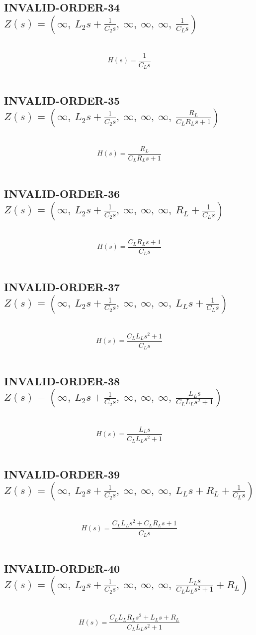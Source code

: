 \documentclass{article}
\begin{document}
\subsection{INVALID-ORDER-34 $Z(s) = \left( \infty, \  L_{2} s + \frac{1}{C_{2} s}, \  \infty, \  \infty, \  \infty, \  \frac{1}{C_{L} s}\right)$ } \ 
\textbf{\[H(s) = \frac{1}{C_{L} s}\] } \ 
\subsection{INVALID-ORDER-35 $Z(s) = \left( \infty, \  L_{2} s + \frac{1}{C_{2} s}, \  \infty, \  \infty, \  \infty, \  \frac{R_{L}}{C_{L} R_{L} s + 1}\right)$ } \ 
\textbf{\[H(s) = \frac{R_{L}}{C_{L} R_{L} s + 1}\] } \ 
\subsection{INVALID-ORDER-36 $Z(s) = \left( \infty, \  L_{2} s + \frac{1}{C_{2} s}, \  \infty, \  \infty, \  \infty, \  R_{L} + \frac{1}{C_{L} s}\right)$ } \ 
\textbf{\[H(s) = \frac{C_{L} R_{L} s + 1}{C_{L} s}\] } \ 
\subsection{INVALID-ORDER-37 $Z(s) = \left( \infty, \  L_{2} s + \frac{1}{C_{2} s}, \  \infty, \  \infty, \  \infty, \  L_{L} s + \frac{1}{C_{L} s}\right)$ } \ 
\textbf{\[H(s) = \frac{C_{L} L_{L} s^{2} + 1}{C_{L} s}\] } \ 
\subsection{INVALID-ORDER-38 $Z(s) = \left( \infty, \  L_{2} s + \frac{1}{C_{2} s}, \  \infty, \  \infty, \  \infty, \  \frac{L_{L} s}{C_{L} L_{L} s^{2} + 1}\right)$ } \ 
\textbf{\[H(s) = \frac{L_{L} s}{C_{L} L_{L} s^{2} + 1}\] } \ 
\subsection{INVALID-ORDER-39 $Z(s) = \left( \infty, \  L_{2} s + \frac{1}{C_{2} s}, \  \infty, \  \infty, \  \infty, \  L_{L} s + R_{L} + \frac{1}{C_{L} s}\right)$ } \ 
\textbf{\[H(s) = \frac{C_{L} L_{L} s^{2} + C_{L} R_{L} s + 1}{C_{L} s}\] } \ 
\subsection{INVALID-ORDER-40 $Z(s) = \left( \infty, \  L_{2} s + \frac{1}{C_{2} s}, \  \infty, \  \infty, \  \infty, \  \frac{L_{L} s}{C_{L} L_{L} s^{2} + 1} + R_{L}\right)$ } \ 
\textbf{\[H(s) = \frac{C_{L} L_{L} R_{L} s^{2} + L_{L} s + R_{L}}{C_{L} L_{L} s^{2} + 1}\] } \ 
\end{document}
